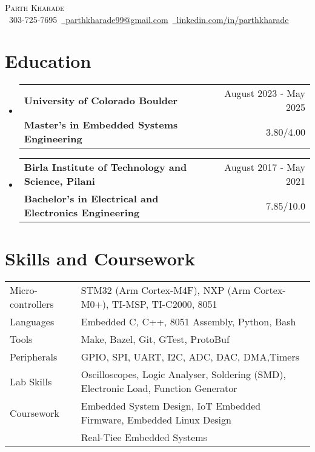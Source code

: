 \documentclass[11pt]{article}
\makeatletter
\newcommand{\resumeSubheading}[4]{
  \vspace{-2pt}\item
    \begin{tabular*}{1.0\textwidth}[t]{l@{\extracolsep{\fill}}r}
       {\large \textbf{#1}}&{\large #2} \\
      \textbf{#3}&{ #4} \\
    \end{tabular*}\vspace{-1pt}
}
\newcommand{\resumeSubHeadingListStart}{\begin{itemize}[leftmargin=0.0in, label={}]}
\newcommand{\resumeSubHeadingListEnd}{\end{itemize}}
\makeatother
\begin{document}
\setlength{\footskip}{4.1pt}
\begin{center}
  {\huge \scshape Parth Kharade} \\ \vspace{1pt}
  \small \raisebox{-0.1\height}\faPhone\ 303-725-7695{\hspace{0.1cm}}~\href{mailto:parthkharade99@gmail.com}{\raisebox{-0.2\height}\faEnvelope\ \underline{parthkharade99@gmail.com}}~{\hspace{0.1cm}}\href{https://www.linkedin.com/in/parth-k-081287184/}{\raisebox{-0.2\height}\faLinkedin\ \underline{linkedin.com/in/parthkharade}}
  \vspace{-10pt}
\end{center}


\section {Education}
\resumeSubHeadingListStart
\resumeSubheading
{University of Colorado Boulder}{August 2023 - May 2025}
{Master's in Embedded Systems Engineering}{3.80/4.00}
\vspace{-0.1in}
\resumeSubheading
{Birla Institute of Technology and Science, Pilani}{August 2017 - May 2021}
{Bachelor's in Electrical and Electronics Engineering}{7.85/10.0}
\resumeSubHeadingListEnd
\vspace{-16pt}
\section{Skills and Coursework}
\vspace{-4mm}
\begin{table}[!htb]
  \begin{tabular} { m{3.1cm} | m{16cm} }
    {Micro-controllers}   & {\: STM32 (Arm Cortex-M4F), NXP (Arm Cortex-M0+), TI-MSP, TI-C2000, 8051}                  \\
    {Languages}           & {\: Embedded C, C++, 8051 Assembly, Python, Bash}               \\
    {Tools}               & {\: Make, Bazel, Git, GTest, ProtoBuf}               \\
    {Peripherals}         & {\: GPIO, SPI, UART, I2C, ADC, DAC, DMA,Timers}                                          \\
    {Lab Skills}          & {\: Oscilloscopes, Logic Analyser, Soldering (SMD), Electronic Load, Function Generator} \\
    {Coursework}          & {\: Embedded System Design, IoT Embedded Firmware, Embedded Linux Design}                \\
    {}                    & {\: Real-Tiee Embedded Systems}
  \end{tabular}
\end{table}
\vspace{-16pt}
\end{document}
